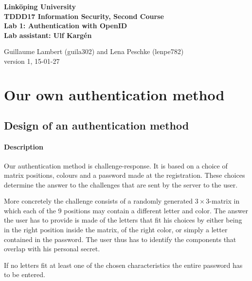 \documentclass[11pt,a4paper]{article}
\begin{document}
	
\begin{center}
{\bfseries
Linköping University\\
TDDD17 Information Security, Second Course\\

Lab 1: Authentication with OpenID\\
Lab assistant: Ulf Kargén\\[10pt]}

Guillaume Lambert (guila302) and Lena Peschke (lenpe782)\\
version 1, 15-01-27
\end{center}

\hrulefill


\section*{Our own authentication method}
\subsection*{Design of an authentication method}
\paragraph{Description}

Our authentication method is challenge-response. It is based on a choice of matrix positions, colours and a password made at the registration.
These choices determine the answer to the challenges that are sent by the server to the user.

More concretely the challenge consists of a randomly generated $3\times3$-matrix in which each of the 9 positions may contain a different letter and color.
The answer the user has to provide is made of the letters that fit his choices by either being in the
right position inside the matrix, of the right color, or simply a letter contained in the password. The user thus has to identify the components that overlap with his personal secret.

If no letters fit at least one of the chosen characteristics the entire password has to be entered.
\end{document}
